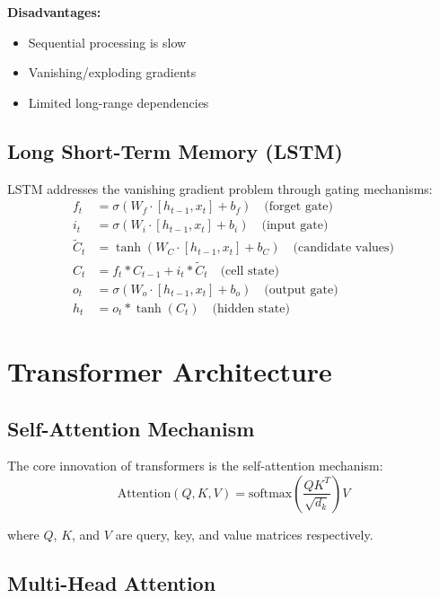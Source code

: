 \textbf{Disadvantages:}
\begin{itemize}
    \item Sequential processing is slow
    \item Vanishing/exploding gradients
    \item Limited long-range dependencies
\end{itemize}

\subsection{Long Short-Term Memory (LSTM)}

LSTM addresses the vanishing gradient problem through gating mechanisms:
\begin{align}
    f_t &= \sigma(W_f \cdot [h_{t-1}, x_t] + b_f) \quad \text{(forget gate)} \\
    i_t &= \sigma(W_i \cdot [h_{t-1}, x_t] + b_i) \quad \text{(input gate)} \\
    \tilde{C}_t &= \tanh(W_C \cdot [h_{t-1}, x_t] + b_C) \quad \text{(candidate values)} \\
    C_t &= f_t * C_{t-1} + i_t * \tilde{C}_t \quad \text{(cell state)} \\
    o_t &= \sigma(W_o \cdot [h_{t-1}, x_t] + b_o) \quad \text{(output gate)} \\
    h_t &= o_t * \tanh(C_t) \quad \text{(hidden state)}
\end{align}

\section{Transformer Architecture}

\subsection{Self-Attention Mechanism}

The core innovation of transformers is the self-attention mechanism:
\begin{equation}
    \text{Attention}(Q, K, V) = \text{softmax}\left(\frac{QK^T}{\sqrt{d_k}}\right)V
\end{equation}

where $Q$, $K$, and $V$ are query, key, and value matrices respectively.

\subsection{Multi-Head Attention}

